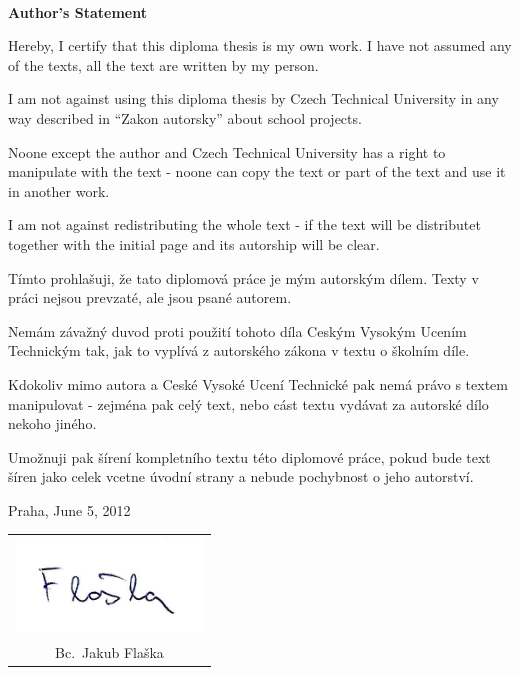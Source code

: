 \documentclass[a4paper,12pt]{report}	%
\newcommand{\autor}{Bc.~Jakub Flaška}
\begin{document}
 

\newpage


\newpage
\tableofcontents


\newpage
\thispagestyle{empty} 

 

\newpage
\thispagestyle{empty}

~
\vfill %

{\bf Author's Statement}

\vspace{0.5cm} %

Hereby, I certify that this diploma thesis is my own work. I have not assumed any of the texts, all the text are written by my person. 

I am not against using this diploma thesis by Czech Technical University in any way described in ``Zakon autorsky'' about school projects.

Noone except the author and Czech Technical University has a right to manipulate with the text - noone can copy the text or part of the text and use it in another work.

I am not against redistributing the whole text - if the text will be distributet together with the initial page and its autorship will be clear.

\vspace{10mm}

Tímto prohlašuji, že tato diplomová práce je mým autorským dílem. Texty v práci nejsou prevzaté, ale jsou psané autorem.

Nemám závažný duvod proti použití tohoto díla Ceským Vysokým Ucením Technickým tak, jak to vyplívá z autorského zákona v textu o školním díle. 

Kdokoliv mimo autora a Ceské Vysoké Ucení Technické pak nemá právo s textem manipulovat - zejména pak celý text, nebo cást textu vydávat za autorské dílo nekoho jiného.

Umožnuji pak šírení kompletního textu této diplomové práce, pokud bude text šíren jako celek vcetne úvodní strany a nebude pochybnost o jeho autorství. 

\vspace{10mm}Praha, June 5, 2012\hfill
	\begin{tabular}{c}
	\includegraphics[width=50mm]{Text/IMG/podpis.jpg}\\ 
	\autor
	\end{tabular}
\end{document}
